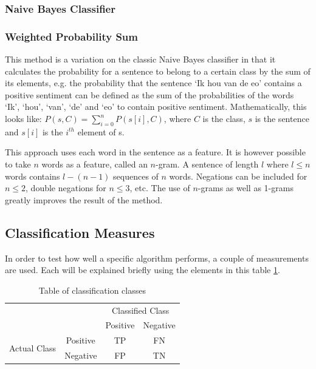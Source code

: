\documentclass[11pt]{article}
\begin{document}
\subsubsection{Naive Bayes Classifier}

\subsubsection{Weighted Probability Sum}
This method is a variation on the classic Naive Bayes classifier in that it calculates the probability for a sentence to belong to a certain class by the sum of its elements, e.g. the probability that the sentence `Ik hou van de eo' contains a positive sentiment can be defined as the sum of the probabilities of the words `Ik', `hou', `van', `de' and `eo' to contain positive sentiment. Mathematically, this looks like:
$\displaystyle P(s, C) = \sum_{i=0}^n P( s[i], C )$, where $C$ is the class, $s $ is the sentence and $s[i]$ is the $i^{th}$ element of s. 

This approach uses each word in the sentence as a feature. It is however possible to take $n$ words as a feature, called an $n$-gram. A sentence of length $l$ where $l \leq n$ words contains $l - (n-1)$ sequences of $n$ words. Negations can be included for $n \leq 2$, double negations for $n \leq 3$, etc. The use of $n$-grams as well as 1-grams greatly improves the result of the method. 

\subsection{Classification Measures}

In order to test how well a specific algorithm performs, a couple of measurements are used. Each will be explained briefly using the elements in this table \ref{classification}.

\begin{table}[h]
\center
\begin{tabular}{cc|c|c|}
\cline{3-4}
& & \multicolumn{2}{|c|}{Classified Class} \\ \cline{3-4}
& &  Positive & Negative \\ \cline{1-4}
\multicolumn{1}{|c|}{\multirow{2}{*}{Actual Class}} &
\multicolumn{1}{|c|}{Positive} &  TP & FN      \\ \cline{2-4}
\multicolumn{1}{|c|}{}                        &
\multicolumn{1}{|c|}{Negative} & FP & TN     \\ \cline{1-4}
\end{tabular}
\caption{Table of classification classes}
\label{classification}
\end{table} 
\end{document}
